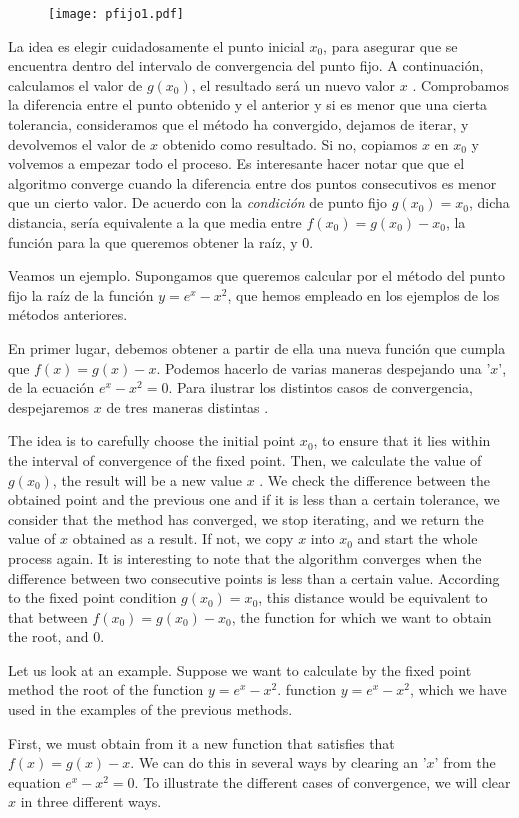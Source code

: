 \begin{figure}[h]
	\texttt{[image: pfijo1.pdf]}
	\label{fig:pfijo01}
\end{figure}

\begin{paracol}{2}
 La idea es elegir cuidadosamente el punto inicial $x_0$, para asegurar que se encuentra dentro del intervalo de convergencia del punto fijo.  A continuación, calculamos el valor de $g(x_0)$, el resultado será un nuevo valor  $x$ .  Comprobamos la diferencia entre el punto obtenido y el anterior y si es menor que una cierta tolerancia,  consideramos que el método ha convergido, dejamos de iterar, y devolvemos el valor de $x$ obtenido como resultado. Si no, copiamos $x$ en $x_0$ y volvemos a empezar todo el proceso. Es interesante hacer notar que que el algoritmo converge cuando la diferencia entre dos puntos consecutivos es menor que un cierto valor.  De acuerdo con la \emph{condición } de punto fijo $g(x_0)=x_0$, dicha distancia, sería equivalente a la que media entre $f(x_0)=g(x_0)-x_0$, la función para la que queremos obtener la raíz,   y $0$.

Veamos un ejemplo. Supongamos  que queremos calcular por el método del punto fijo la raíz de la  
función $y=e^x-x^2$, que hemos empleado en los ejemplos de los métodos anteriores.

En primer lugar, debemos obtener a partir de ella una nueva función que cumpla que $f(x)=g(x)-x$. Podemos hacerlo de varias maneras despejando una '$x$', de la ecuación $e^x-x^2=0$.  Para ilustrar los distintos casos de convergencia, despejaremos $x$ de tres maneras distintas .


\switchcolumn

The idea is to carefully choose the initial point $x_0$, to ensure that it lies within the interval of convergence of the fixed point. Then, we calculate the value of $g(x_0)$, the result will be a new value $x$ . We check the difference between the obtained point and the previous one and if it is less than a certain tolerance, we consider that the method has converged, we stop iterating, and we return the value of $x$ obtained as a result. If not, we copy $x$ into $x_0$ and start the whole process again. It is interesting to note that the algorithm converges when the difference between two consecutive points is less than a certain value. According to the fixed point condition $g(x_0)=x_0$, this distance would be equivalent to that between $f(x_0)=g(x_0)-x_0$, the function for which we want to obtain the root, and $0$.

Let us look at an example. Suppose we want to calculate by the fixed point method the root of the function $y=e^x-x^2$. 
function $y=e^x-x^2$, which we have used in the examples of the previous methods.

First, we must obtain from it a new function that satisfies that $f(x)=g(x)-x$. We can do this in several ways by clearing an '$x$' from the equation $e^x-x^2=0$. To illustrate the different cases of convergence, we will clear $x$ in three different ways.
\end{paracol}


